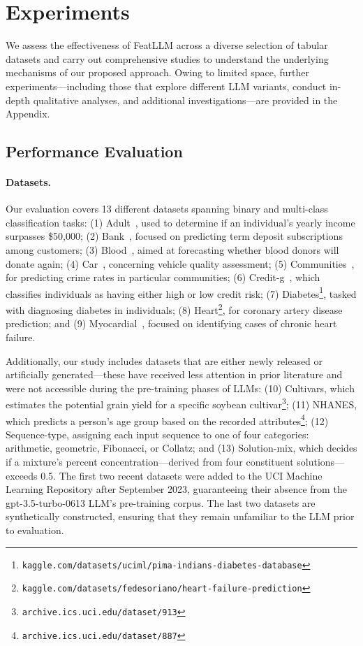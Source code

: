 \section{Experiments}
We assess the effectiveness of \textsf{FeatLLM} across a diverse selection of tabular datasets and carry out comprehensive studies to understand the underlying mechanisms of our proposed approach. Owing to limited space, further experiments—including those that explore different LLM variants, conduct in-depth qualitative analyses, and additional investigations—are provided in the Appendix.

\subsection{Performance Evaluation}
\paragraph{Datasets.}
Our evaluation covers 13 different datasets spanning binary and multi-class classification tasks: (1) Adult~\cite{asuncion2007uci}, used to determine if an individual's yearly income surpasses \$50,000; (2) Bank~\cite{moro2014data}, focused on predicting term deposit subscriptions among customers; (3) Blood~\cite{yeh2009knowledge}, aimed at forecasting whether blood donors will donate again; (4) Car~\cite{kadra2021well}, concerning vehicle quality assessment; (5) Communities~\cite{misc_communities_and_crime_183}, for predicting crime rates in particular communities; (6) Credit-g~\cite{kadra2021well}, which classifies individuals as having either high or low credit risk; (7) Diabetes\footnote{\texttt{kaggle.com/datasets/uciml/pima-indians-diabetes-database}}, tasked with diagnosing diabetes in individuals; (8) Heart\footnote{\texttt{kaggle.com/datasets/fedesoriano/heart-failure-prediction}}, for coronary artery disease prediction; and (9) Myocardial~\cite{misc_myocardial_infarction_complications_579}, focused on identifying cases of chronic heart failure.

Additionally, our study includes datasets that are either newly released or artificially generated—these have received less attention in prior literature and were not accessible during the pre-training phases of LLMs: (10) Cultivars, which estimates the potential grain yield for a specific soybean cultivar\footnote{\texttt{archive.ics.uci.edu/dataset/913}}; (11) NHANES, which predicts a person's age group based on the recorded attributes\footnote{\texttt{archive.ics.uci.edu/dataset/887}}; (12) Sequence-type, assigning each input sequence to one of four categories: arithmetic, geometric, Fibonacci, or Collatz; and (13) Solution-mix, which decides if a mixture's percent concentration—derived from four constituent solutions—exceeds 0.5. The first two recent datasets were added to the UCI Machine Learning Repository after September 2023, guaranteeing their absence from the gpt-3.5-turbo-0613 LLM’s pre-training corpus. The last two datasets are synthetically constructed, ensuring that they remain unfamiliar to the LLM prior to evaluation.

